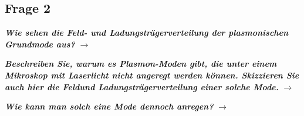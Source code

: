 \subsection{\label{subsec:FZV2}Frage 2}
\textbf{\textit{Wie sehen die Feld- und Ladungsträgerverteilung der plasmonischen Grundmode
aus?}}
$\rightarrow$

\textbf{\textit{Beschreiben Sie, warum es Plasmon-Moden gibt, die unter einem Mikroskop
mit Laserlicht nicht angeregt werden können. Skizzieren Sie auch hier die Feldund
Ladungsträgerverteilung einer solche Mode.}}
$\rightarrow$

\textbf{\textit{Wie kann man solch eine Mode dennoch anregen?}}
$\rightarrow$